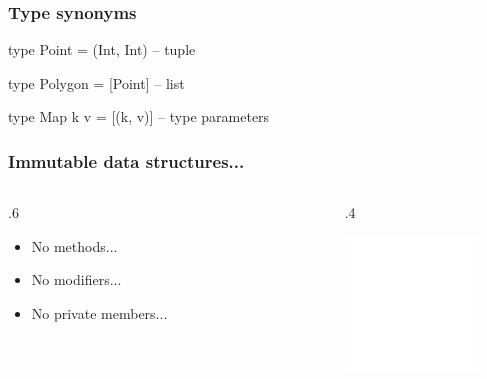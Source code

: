 \documentclass[17pt]{beamer}
\renewcommand{\(}[1]{\begin{columns}[#1]}
\renewcommand{\)}{\end{columns}}
\newcommand{\<}[1]{\begin{column}{#1}}
\renewcommand{\>}{\end{column}}
\begin{document}
\begin{frame}[fragile]
\frametitle{Type synonyms}
\begin{code}
    type Point   = (Int, Int)  -- tuple
\end{code}
\pause
\begin{code}
    type Polygon = [Point]     -- list
\end{code}
\pause
\begin{code}
    type Map k v = [(k, v)]    -- type parameters
\end{code}
\end{frame}

\begin{frame}
\frametitle{Immutable data structures...}
\({c}
\<{.6\textwidth}
\begin{center}
  \begin{itemize}
  \item<2-> No methods...
  \item<3-> No modifiers...
  \item<4-> No private members...
  \end{itemize}
\end{center}
\>
\<{.4\textwidth}
\begin{center}
  \includegraphics[width=0.8\textwidth]{img/replace_me_with_anything_you_want}
\end{center}
\>
\)
\end{frame}
\end{document}
